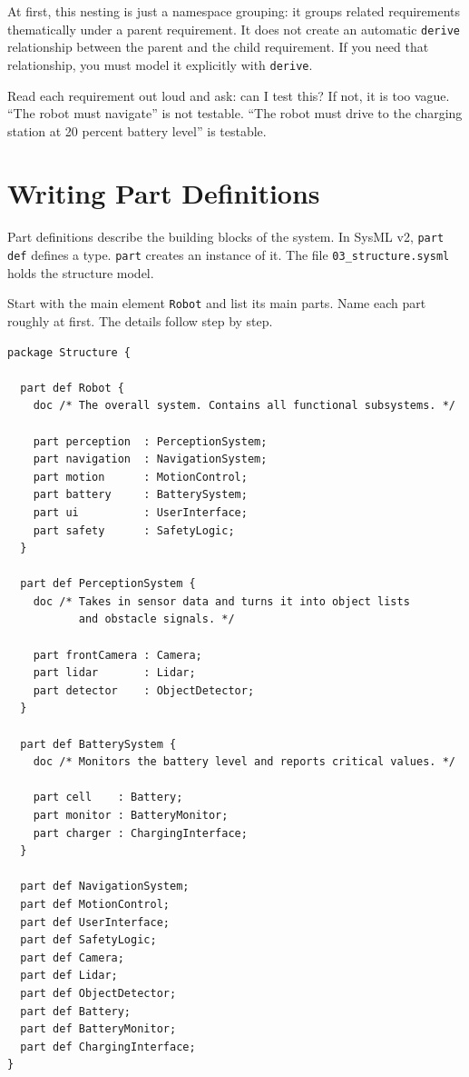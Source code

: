 At first, this nesting is just a namespace grouping: it groups related requirements thematically under a parent requirement. It does not create an automatic \texttt{derive} relationship between the parent and the child requirement. If you need that relationship, you must model it explicitly with \texttt{derive}.

Read each requirement out loud and ask: can I test this? If not, it is too vague. \enquote{The robot must navigate} is not testable. \enquote{The robot must drive to the charging station at 20 percent battery level} is testable.

\section{Writing Part Definitions}

Part definitions describe the building blocks of the system. In SysML v2, \texttt{part def} defines a type. \texttt{part} creates an instance of it. The file \texttt{03\_structure.sysml} holds the structure model.

Start with the main element \texttt{Robot} and list its main parts. Name each part roughly at first. The details follow step by step.

\begin{lstlisting}
package Structure {

  part def Robot {
    doc /* The overall system. Contains all functional subsystems. */

    part perception  : PerceptionSystem;
    part navigation  : NavigationSystem;
    part motion      : MotionControl;
    part battery     : BatterySystem;
    part ui          : UserInterface;
    part safety      : SafetyLogic;
  }

  part def PerceptionSystem {
    doc /* Takes in sensor data and turns it into object lists
           and obstacle signals. */

    part frontCamera : Camera;
    part lidar       : Lidar;
    part detector    : ObjectDetector;
  }

  part def BatterySystem {
    doc /* Monitors the battery level and reports critical values. */

    part cell    : Battery;
    part monitor : BatteryMonitor;
    part charger : ChargingInterface;
  }

  part def NavigationSystem;
  part def MotionControl;
  part def UserInterface;
  part def SafetyLogic;
  part def Camera;
  part def Lidar;
  part def ObjectDetector;
  part def Battery;
  part def BatteryMonitor;
  part def ChargingInterface;
}
\end{lstlisting}

